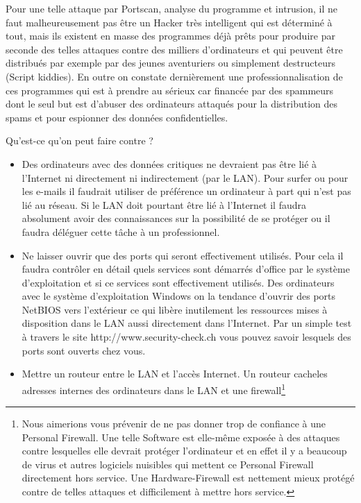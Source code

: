 Pour une telle attaque par Portscan, analyse du programme et intrusion, il ne faut malheureusement pas être un Hacker très intelligent qui est déterminé à tout, mais ils existent en masse des programmes déjà prêts pour produire par seconde des telles attaques contre des milliers d'ordinateurs et qui peuvent être distribués par exemple par des jeunes aventuriers ou simplement destructeurs (\glqq Script kiddies\grqq). En outre on constate dernièrement une professionnalisation de ces programmes qui est à prendre au sérieux car financée par des spammeurs dont le seul but est d'abuser des ordinateurs attaqués pour la distribution des spams et pour espionner des données confidentielles.

\medskip

Qu'est-ce qu'on peut faire contre ?
\begin{itemize}
  \item {Des ordinateurs avec des données critiques ne devraient pas être lié à l'Internet ni directement ni indirectement (par le LAN). Pour surfer ou pour les e-mails il faudrait utiliser de préférence un ordinateur à part qui n'est pas lié au réseau. Si le LAN doit pourtant être lié à l'Internet il faudra absolument avoir des connaissances sur la possibilité de se protéger ou il faudra déléguer cette tâche à un professionnel.}
  \item  {Ne laisser ouvrir que des ports qui seront effectivement utilisés. Pour cela il faudra contrôler en détail quels services sont démarrés d'office par le système d'exploitation et si ce services sont effectivement utilisés. Des ordinateurs avec le système d'exploitation Windows on la tendance d'ouvrir des ports NetBIOS vers l'extérieur ce qui libère inutilement les ressources mises à disposition dans le LAN aussi directement dans l'Internet. Par un simple test à travers le site http://www.security-check.ch vous pouvez savoir lesquels des ports sont ouverts chez vous.}
  \item{Mettre un routeur entre le LAN et l'accès Internet. Un routeur  \glqq cache\grqq{}les adresses internes des ordinateurs dans le LAN et une firewall\footnote{Nous aimerions vous prévenir de ne pas donner trop de confiance à une  \glqq Personal Firewall\grqq{}. Une telle Software est elle-même exposée à des attaques contre lesquelles elle devrait protéger l'ordinateur et en effet il y a beaucoup de virus et autres logiciels nuisibles qui mettent ce Personal Firewall directement hors service. Une Hardware-Firewall est nettement mieux protégé contre de telles attaques et difficilement à mettre hors service.

}}
\end{itemize}
